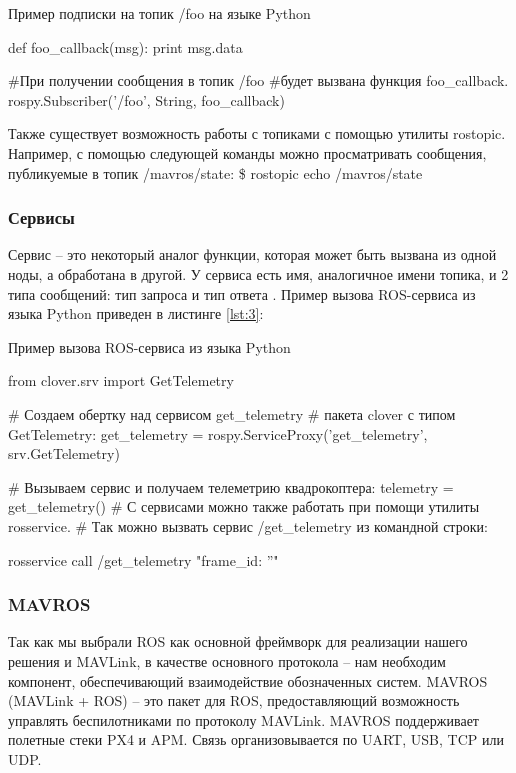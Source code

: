 \begin{Program}[H]
	\caption{Пример подписки на топик /foo на языке Python} \label{lst:3}
\begin{MyCode}
	def foo_callback(msg):
	print msg.data
	
	#При получении сообщения в топик /foo
	#будет вызвана функция foo_callback.
	rospy.Subscriber('/foo', String, foo_callback)
\end{MyCode}
\end{Program}

Также существует возможность работы с топиками с помощью утилиты rostopic. Например, с помощью следующей команды можно просматривать сообщения, публикуемые в топик /mavros/state:
\$ rostopic echo /mavros/state
\subsubsection{Сервисы}

Сервис – это некоторый аналог функции, которая может быть вызвана из одной ноды, а обработана в другой. У сервиса есть имя, аналогичное имени топика, и 2 типа сообщений: тип запроса и тип ответа \cite{clover}. Пример вызова ROS-сервиса из языка Python приведен в листинге \ref{lst:3}:

\begin{Program}[H]
	\caption{Пример вызова ROS-сервиса из языка Python} \label{lst:4}
\begin{MyCode}
	from clover.srv import GetTelemetry
	
	# Создаем обертку над сервисом get_telemetry
	# пакета clover с типом GetTelemetry:
	get_telemetry = rospy.ServiceProxy('get_telemetry',
	  srv.GetTelemetry)
	
	# Вызываем сервис и получаем телеметрию квадрокоптера:
	telemetry = get_telemetry()
	# С сервисами можно также работать при помощи утилиты rosservice.
	# Так можно вызвать сервис /get_telemetry из командной строки:
	
	rosservice call /get_telemetry "{frame_id: ''}"
\end{MyCode}
\end{Program}

\subsubsection{MAVROS}
Так как мы выбрали ROS как основной фреймворк для реализации нашего решения и MAVLink, в качестве основного протокола -- нам необходим компонент, обеспечивающий взаимодействие обозначенных систем.
MAVROS (MAVLink + ROS) -- это пакет для ROS, предоставляющий возможность управлять беспилотниками по протоколу MAVLink. MAVROS поддерживает полетные стеки PX4 и APM. Связь организовывается по UART, USB, TCP или UDP.

